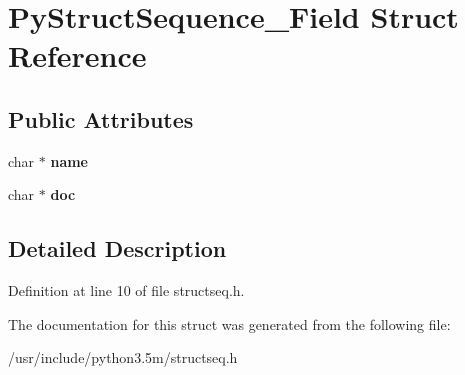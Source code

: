 \hypertarget{structPyStructSequence__Field}{}\section{Py\+Struct\+Sequence\+\_\+\+Field Struct Reference}
\label{structPyStructSequence__Field}
\subsection*{Public Attributes}
\begin{DoxyCompactItemize}
\item 
char $\ast$ {\bfseries name}\hypertarget{structPyStructSequence__Field_a9ad1abe28ed8301444b36581dc3e95f7}{}\label{structPyStructSequence__Field_a9ad1abe28ed8301444b36581dc3e95f7}

\item 
char $\ast$ {\bfseries doc}\hypertarget{structPyStructSequence__Field_a6ba9e53c3ef3bb4b92a1a2ff70f71f64}{}\label{structPyStructSequence__Field_a6ba9e53c3ef3bb4b92a1a2ff70f71f64}

\end{DoxyCompactItemize}


\subsection{Detailed Description}


Definition at line 10 of file structseq.\+h.



The documentation for this struct was generated from the following file\+:\begin{DoxyCompactItemize}
\item 
/usr/include/python3.\+5m/structseq.\+h\end{DoxyCompactItemize}
